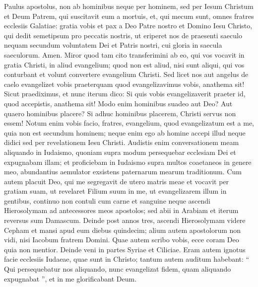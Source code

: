 \begin{biblechapter}
 \verse Paulus apostolus, non ab hominibus neque per hominem, sed per Iesum Christum et Deum Patrem, qui suscitavit eum a mortuis, 
\verse et, qui mecum sunt, omnes fratres ecclesiis Galatiae: 
\verse gratia vobis et pax a Deo Patre nostro et Domino Iesu Christo, 
\verse qui dedit semetipsum pro peccatis nostris, ut eriperet nos de praesenti saeculo nequam secundum voluntatem Dei et Patris nostri, 
\verse cui gloria in saecula saeculorum. Amen.
 \verse Miror quod tam cito transferimini ab eo, qui vos vocavit in gratia Christi, in aliud evangelium; 
\verse quod non est aliud, nisi sunt aliqui, qui vos conturbant et volunt convertere evangelium Christi. 
\verse Sed licet nos aut angelus de caelo evangelizet vobis praeterquam quod evangelizavimus vobis, anathema sit! 
 \verse Sicut praediximus, et nunc iterum dico: Si quis vobis evangelizaverit praeter id, quod accepistis, anathema sit! 
\verse Modo enim hominibus suadeo aut Deo? Aut quaero hominibus placere? Si adhuc hominibus placerem, Christi servus non essem!
 \verse Notum enim vobis facio, fratres, evangelium, quod evangelizatum est a me, quia non est secundum hominem; 
\verse neque enim ego ab homine accepi illud neque didici sed per revelationem Iesu Christi. 
\verse Audistis enim conversationem meam aliquando in Iudaismo, quoniam supra modum persequebar ecclesiam Dei et expugnabam illam; 
\verse et proficiebam in Iudaismo supra multos coaetaneos in genere meo, abundantius aemulator exsistens paternarum mearum traditionum. 
\verse Cum autem placuit Deo, qui me segregavit de utero matris meae et vocavit per gratiam suam, 
\verse ut revelaret Filium suum in me, ut evangelizarem illum in gentibus, continuo non contuli cum carne et sanguine 
 \verse neque ascendi Hierosolymam ad antecessores meos apostolos; sed abii in Arabiam et iterum reversus sum Damascum.
 \verse Deinde post annos tres, ascendi Hierosolymam videre Cepham et mansi apud eum diebus quindecim; 
\verse alium autem apostolorum non vidi, nisi Iacobum fratrem Domini. 
\verse Quae autem scribo vobis, ecce coram Deo quia non mentior. 
\verse Deinde veni in partes Syriae et Ciliciae. 
\verse Eram autem ignotus facie ecclesiis Iudaeae, quae sunt in Christo; 
\verse tantum autem auditum habebant: “ Qui persequebatur nos aliquando, nunc evangelizat fidem, quam aliquando expugnabat ”, 
\verse et in me glorificabant Deum.
 

\end{biblechapter}
